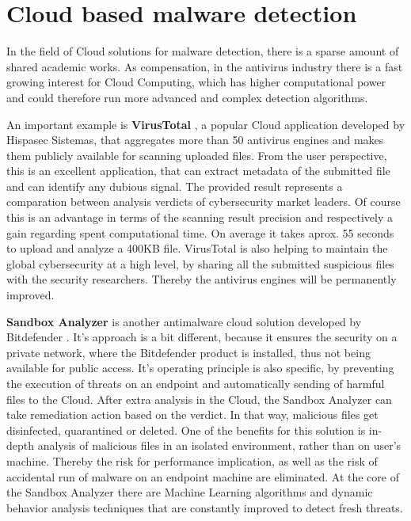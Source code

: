 \section{Cloud based malware detection}
\label{section:relatedWorkCloud}
In the field of Cloud solutions for malware detection, there is a sparse amount of shared academic works. As compensation, in the antivirus industry there is a fast growing interest for Cloud Computing, which has higher computational power and could therefore run more advanced and complex detection algorithms. \par
An important example is \textbf{VirusTotal} \cite{virustotal}, a popular Cloud application developed by Hispasec Sistemas, that aggregates more than 50 antivirus engines and makes them publicly available for scanning uploaded files. From the user perspective, this is an excellent application, that can extract metadata of the submitted file and can identify any dubious signal. The provided result represents a comparation between analysis verdicts of cybersecurity market leaders. Of course this is an advantage in terms of the scanning result precision and respectively a gain regarding spent computational time. On average it takes aprox. 55 seconds to upload and analyze a 400KB file. VirusTotal is also helping to maintain the global cybersecurity at a high level, by sharing all the submitted suspicious files with the security researchers. Thereby the antivirus engines will be permanently improved. \par
\textbf{Sandbox Analyzer} is another antimalware cloud solution developed by Bitdefender \cite{bdSandbox}. It's approach is a bit different, because it
ensures the security on a private network, where the Bitdefender product is installed, thus not being available for public access. It's operating principle is also specific, by preventing the execution of threats on an endpoint and automatically sending of harmful files to the Cloud. After extra analysis in the Cloud, the Sandbox Analyzer can take remediation action based on the verdict. In that way, malicious files get disinfected, quarantined or deleted. One of the benefits for this solution is in-depth analysis of malicious files in an isolated environment, rather than on user's machine. Thereby the risk for performance implication, as well as the risk of accidental run of malware on an endpoint machine are eliminated. At the core of the Sandbox Analyzer there are Machine Learning algorithms and dynamic behavior analysis techniques that are constantly improved to detect fresh threats.


